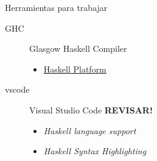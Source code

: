 \begin{frame}{Herramientas para trabajar}
    \begin{description}
        \item[GHC] Glasgow Haskell Compiler
        \begin{itemize}
            \item \href{https://www.haskell.org/downloads/}{Haskell Platform}
        \end{itemize} 
        \item[vscode] Visual Studio Code \textbf{REVISAR!}
        \begin{itemize}
            \item \emph{Haskell language support}
            \item \emph{Haskell Syntax Highlighting}
        \end{itemize}
    \end{description}
\end{frame}
